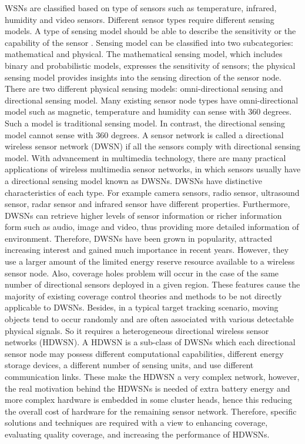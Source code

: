 \documentclass[final]{elsarticle}
\begin{document}
WSNs are classified based on type of sensors such as temperature, infrared, humidity and video sensors. Different sensor types require different sensing models. A type of sensing model should be able to describe the sensitivity or the capability of the sensor \cite{b10}. Sensing model can be classified into two subcategories: mathematical and physical. The mathematical sensing model, which includes binary and probabilistic models, expresses the sensitivity of sensors; the physical sensing model provides insights into the sensing direction of the sensor node. There are two different physical sensing models: omni-directional sensing and directional sensing model. Many existing sensor node types have omni-directional model such as magnetic, temperature and humidity can sense with 360 degrees. Such a model is traditional sensing model. In contrast, the directional sensing model cannot sense with 360 degrees. A sensor network is called a directional wireless sensor network (DWSN) if all the sensors comply with directional sensing model. With advancement in multimedia technology, there are many practical applications of wireless multimedia sensor networks, in which sensors usually have a directional sensing model known as DWSNs. DWSNs have distinctive characteristics of each type. For example camera sensors, radio sensor, ultrasound sensor, radar sensor and infrared sensor have different properties. Furthermore, DWSNs can retrieve higher levels of sensor information or richer information form such as audio, image and video, thus providing more detailed information of environment. Therefore, DWSNs have been grown in popularity, attracted increasing interest and gained much importance in recent years. However, they use a larger amount of the limited energy reserve resource available to a wireless sensor node. Also, coverage holes problem will occur in the case of the same number of directional sensors deployed in a given region. These features cause the majority of existing coverage control theories and methods to be not directly applicable to DWSNs. Besides, in a typical target tracking scenario, moving objects tend to occur randomly and are often associated with various detectable physical signals. 
So it requires a heterogeneous directional wireless sensor networks (HDWSN). A HDWSN is a sub-class of DWSNs which each directional sensor node may possess different computational capabilities, different energy storage devices, a different number of sensing units, and use different communication links. These make the HDWSN a very complex network, however, the real motivation behind the HDWSNs is needed of extra battery energy and more complex hardware is embedded in some cluster heads, hence this reducing the overall cost of hardware for the remaining sensor network. Therefore, specific solutions and techniques are required with a view to enhancing coverage, evaluating quality coverage, and increasing the performance of HDWSNs. 
\end{document}
